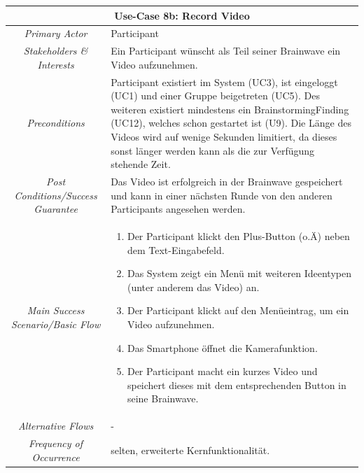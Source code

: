 \renewcommand{\arraystretch}{1.35}
\begin{center}
	\begin{longtable}{| c | p{7cm} |}
		\hline
		\multicolumn{2}{|c|}{\textbf{Use-Case 8b: Record Video}}\\
		\hline\hline
		\textit{Primary Actor} & Participant\\
		\hline
		\textit{Stakeholders \& Interests} & Ein Participant wünscht als Teil seiner Brainwave ein Video aufzunehmen. \\
		\hline
		\textit{Preconditions} & Participant existiert im System (UC3), ist eingeloggt (UC1) und einer Gruppe beigetreten (UC5). Des weiteren existiert mindestens ein BrainstormingFinding (UC12), welches schon gestartet ist (U9). Die Länge des Videos wird auf wenige Sekunden limitiert, da dieses sonst länger werden kann als die zur Verfügung stehende Zeit.\\
		\hline
		\textit{Post Conditions/Success Guarantee} & Das Video ist erfolgreich in der Brainwave gespeichert und kann in einer nächsten Runde von den anderen Participants angesehen werden.\\
		\hline
		\textit{Main Success Scenario/Basic Flow} & 
		\begin{enumerate}[noitemsep]
			\item Der Participant klickt den Plus-Button (o.Ä) neben dem Text-Eingabefeld.
			\item Das System zeigt ein Menü mit weiteren Ideentypen (unter anderem das Video) an.
			\item Der Participant klickt auf den Menüeintrag, um ein Video aufzunehmen.
			\item Das Smartphone öffnet die Kamerafunktion.
			\item Der Participant macht ein kurzes Video und speichert dieses mit dem entsprechenden Button in seine Brainwave.
		\end{enumerate}\\
		\hline
		\textit{Alternative Flows} &
		-\\
		\hline
		\textit{Frequency of Occurrence} & selten, erweiterte Kernfunktionalität.\\
		\hline
	\end{longtable}
\end{center}


